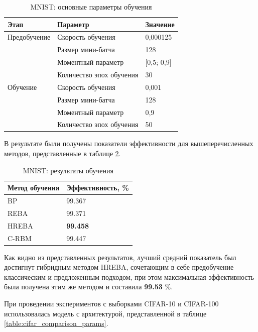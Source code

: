 \begin{table} [!h]
  \caption{MNIST: основные параметры обучения}\label{table:mnist_comparing_params}
\centering
\begin{tabular}{| p{3cm} | p{6cm} | p{2.5cm} |}
  \hline
    \textbf{Этап} & \textbf{Параметр} & \textbf{Значение}\\
    \hline
    Предобучение & Скорость обучения & 0,000125\\
    \cline{2-3}
    & Размер мини-батча & 128 \\
    \cline{2-3}
    & Моментный параметр & [0,5; 0,9] \\
    \cline{2-3}
    & Количество эпох обучения & 30\\
    \hline
    Обучение & Скорость обучения & 0,001\\
    \cline{2-3}
    & Размер мини-батча & 128 \\
    \cline{2-3}
    & Моментный параметр & 0,9 \\
    \cline{2-3}
    & Количество эпох обучения & 50\\
    \hline
\end{tabular}
\end{table}

В результате были получены показатели эффективности для вышеперечисленных методов, представленные в таблице \ref{table:mnist_results}.

\begin{table} [!h]
  \caption{MNIST: результаты обучения}\label{table:mnist_results}
\centering
\begin{tabular}{| p{6cm} | p{6cm} |}
  \hline
    \textbf{Метод обучения} & \textbf{Эффективность, \%}\\
    \hline
    BP & 99.367\\
    \hline
    REBA & 99.371\\
    \hline
    HREBA & \textbf{99.458}\\
    \hline
    C-RBM & 99.447\\
    \hline
\end{tabular}
\end{table}

Как видно из представленных результатов, лучший средний показатель был достигнут гибридным методом HREBA, сочетающим в себе предобучение классическим и предложенным подходом, при этом максимальная эффективность была получена этим же методом и составила \textbf{99.53} \%.

При проведении экспериментов с выборками CIFAR-10 и CIFAR-100 использовалась модель с архитектурой, представленной в таблице \ref{table:cifar_comparison_params}.

